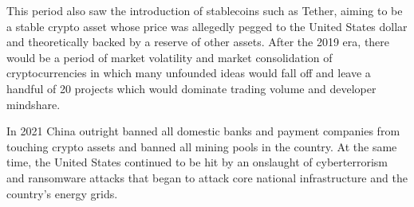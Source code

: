 
This period also saw the introduction of stablecoins such as Tether, aiming to
be a stable crypto asset whose price was allegedly pegged to the United States
dollar and theoretically backed by a reserve of other assets. After the 2019
era, there would be a period of market volatility and market consolidation of
cryptocurrencies in which many unfounded ideas would fall off and leave a
handful of 20 projects which would dominate trading volume and developer
mindshare.


In 2021 China outright banned all domestic banks and payment companies from
touching crypto assets and banned all mining pools in the country. At the same
time, the United States continued to be hit by an onslaught of cyberterrorism
and ransomware attacks that began to attack core national infrastructure and the
country's energy grids.

